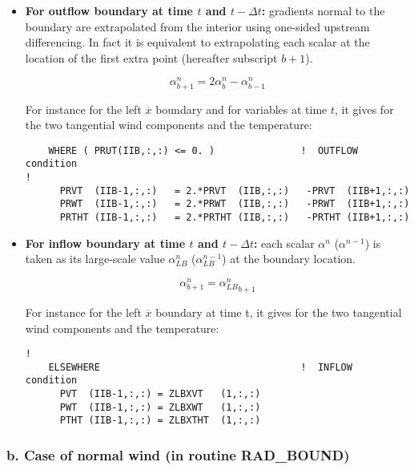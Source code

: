 \begin{itemize}
\item {\bf For outflow boundary at time $t$ and $t - \Delta t$:} gradients
normal to the boundary are
extrapolated from the interior using one-sided upstream differencing. In
fact it is equivalent to extrapolating each scalar at the location of the
first extra point (hereafter subscript $b+1$).

\begin{equation}
\label{inflow}
\alpha^{n}_{b+1} = 2 \alpha^{n}_b -  \alpha^{n}_{b-1}
\end{equation}

 For instance for the left $\overline x$ boundary and for variables at time $t$,
it gives for the two
tangential wind components and the temperature:
\begin{verbatim}
    WHERE ( PRUT(IIB,:,:) <= 0. )               !  OUTFLOW condition
!
      PRVT  (IIB-1,:,:)   = 2.*PRVT  (IIB,:,:)   -PRVT  (IIB+1,:,:)
      PRWT  (IIB-1,:,:)   = 2.*PRWT  (IIB,:,:)   -PRWT  (IIB+1,:,:)
      PRTHT (IIB-1,:,:)   = 2.*PRTHT (IIB,:,:)   -PRTHT (IIB+1,:,:)
\end{verbatim}

\item {\bf For inflow boundary at time $t$ and $t - \Delta t$:}
each scalar $\alpha^{n}$ ($\alpha^{n-1}$) is taken as its large-scale value
$\alpha^{n}_{LB}$ ($\alpha^{n-1}_{LB}$) at the boundary location.

\begin{equation}
\label{inflow}
\alpha^{n}_{b+1} =  {\alpha^{n}_{LB}}_{b+1}
\end{equation}

 For instance for the left $\overline x$ boundary at time t, it gives for the
two tangential wind components and the temperature:

\begin{verbatim}
!
    ELSEWHERE                                   !  INFLOW  condition
      PVT  (IIB-1,:,:) = ZLBXVT   (1,:,:)
      PWT  (IIB-1,:,:) = ZLBXWT   (1,:,:)
      PTHT (IIB-1,:,:) = ZLBXTHT  (1,:,:)
\end{verbatim}

\end{itemize}

\subsubsection{b. Case of normal wind (in routine RAD\_BOUND)}

